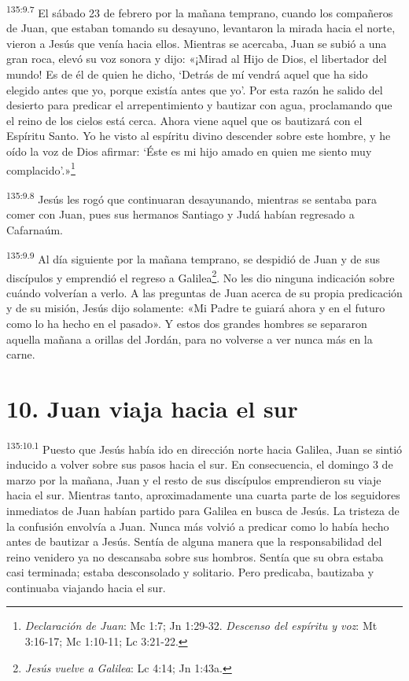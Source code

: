 \par 
\textsuperscript{135:9.7} El sábado 23 de febrero por la mañana temprano, cuando los compañeros de Juan, que estaban tomando su desayuno, levantaron la mirada hacia el norte, vieron a Jesús que venía hacia ellos. Mientras se acercaba, Juan se subió a una gran roca, elevó su voz sonora y dijo: «¡Mirad al Hijo de Dios, el libertador del mundo! Es de él de quien he dicho, `Detrás de mí vendrá aquel que ha sido elegido antes que yo, porque existía antes que yo'. Por esta razón he salido del desierto para predicar el arrepentimiento y bautizar con agua, proclamando que el reino de los cielos está cerca. Ahora viene aquel que os bautizará con el Espíritu Santo. Yo he visto al espíritu divino descender sobre este hombre, y he oído la voz de Dios afirmar: `Éste es mi hijo amado en quien me siento muy complacido'.»\footnote{\textit{Declaración de Juan}: Mc 1:7; Jn 1:29-32. \textit{Descenso del espíritu y voz}: Mt 3:16-17; Mc 1:10-11; Lc 3:21-22.}

\par 
\textsuperscript{135:9.8} Jesús les rogó que continuaran desayunando, mientras se sentaba para comer con Juan, pues sus hermanos Santiago y Judá habían regresado a Cafarnaúm.

\par 
\textsuperscript{135:9.9} Al día siguiente por la mañana temprano, se despidió de Juan y de sus discípulos y emprendió el regreso a Galilea\footnote{\textit{Jesús vuelve a Galilea}: Lc 4:14; Jn 1:43a.}. No les dio ninguna indicación sobre cuándo volverían a verlo. A las preguntas de Juan acerca de su propia predicación y de su misión, Jesús dijo solamente: «Mi Padre te guiará ahora y en el futuro como lo ha hecho en el pasado». Y estos dos grandes hombres se separaron aquella mañana a orillas del Jordán, para no volverse a ver nunca más en la carne.

\section*{10. Juan viaja hacia el sur}
\par 
\textsuperscript{135:10.1} Puesto que Jesús había ido en dirección norte hacia Galilea, Juan se sintió inducido a volver sobre sus pasos hacia el sur. En consecuencia, el domingo 3 de marzo por la mañana, Juan y el resto de sus discípulos emprendieron su viaje hacia el sur. Mientras tanto, aproximadamente una cuarta parte de los seguidores inmediatos de Juan habían partido para Galilea en busca de Jesús. La tristeza de la confusión envolvía a Juan. Nunca más volvió a predicar como lo había hecho antes de bautizar a Jesús. Sentía de alguna manera que la responsabilidad del reino venidero ya no descansaba sobre sus hombros. Sentía que su obra estaba casi terminada; estaba desconsolado y solitario. Pero predicaba, bautizaba y continuaba viajando hacia el sur.

